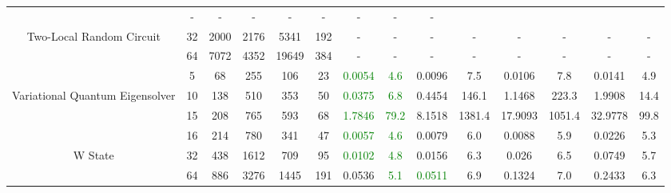 \begin{table}[htb]
{\begin{tabular}{|c|c|c|c|c|c|c|c|c|c|c|c|c|c|}
 & - & -
 & - & -
 & - & -
 & - & -
 \\
Two-Local Random Circuit & 
32 & 2000 & 2176 & 5341 & 192
 & - & -
 & - & -
 & - & -
 & - & -
 \\
 & 
64 & 7072 & 4352 & 19649 & 384
 & - & -
 & - & -
 & - & -
 & - & -
 \\
\hline
 & 
5 & 68 & 255 & 106 & 23
 & \textcolor{green}{0.0054} & \textcolor{green}{4.6}
 & 0.0096 & 7.5
 & 0.0106 & 7.8
 & 0.0141 & 4.9
 \\
Variational Quantum Eigensolver & 
10 & 138 & 510 & 353 & 50
 & \textcolor{green}{0.0375} & \textcolor{green}{6.8}
 & 0.4454 & 146.1
 & 1.1468 & 223.3
 & 1.9908 & 14.4
 \\
 & 
15 & 208 & 765 & 593 & 68
 & \textcolor{green}{1.7846} & \textcolor{green}{79.2}
 & 8.1518 & 1381.4
 & 17.9093 & 1051.4
 & 32.9778 & 99.8
 \\
\hline
 & 
16 & 214 & 780 & 341 & 47
 & \textcolor{green}{0.0057} & \textcolor{green}{4.6}
 & 0.0079 & 6.0
 & 0.0088 & 5.9
 & 0.0226 & 5.3
 \\
W State & 
32 & 438 & 1612 & 709 & 95
 & \textcolor{green}{0.0102} & \textcolor{green}{4.8}
 & 0.0156 & 6.3
 & 0.026 & 6.5
 & 0.0749 & 5.7
 \\
 & 
64 & 886 & 3276 & 1445 & 191
 & 0.0536 & \textcolor{green}{5.1}
 & \textcolor{green}{0.0511} & 6.9
 & 0.1324 & 7.0
 & 0.2433 & 6.3
 \\
\hline
\end{tabular}}
\end{table}